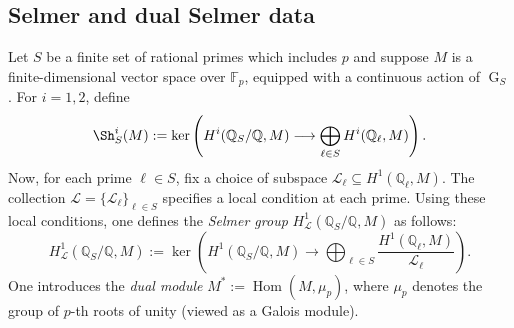 \documentclass[table]{amsart}
\numberwithin{equation}{section}
\begin{document}
\subsection{Selmer and dual Selmer data}
\par Let \( S \) be a finite set of rational primes which includes \( p \) and suppose \( M \) is a finite-dimensional vector space over \( \mathbb{F}_p \), equipped with a continuous action of \( \operatorname{G}_S\). For \( i = 1,2 \), define
\[
\Sh_S^i(M) := \ker\left( H^i(\mathbb{Q}_S/\mathbb{Q}, M) \longrightarrow \bigoplus_{\ell \in S} H^i(\mathbb{Q}_\ell, M) \right).
\]
Now, for each prime \( \ell \in S \), fix a choice of subspace \( \mathcal{L}_\ell \subseteq H^1(\mathbb{Q}_\ell, M) \). The collection \( \mathcal{L} = \{ \mathcal{L}_\ell \}_{\ell \in S} \) specifies a local condition at each prime. Using these local conditions, one defines the \emph{Selmer group} \( H^1_{\mathcal{L}}(\mathbb{Q}_S/\mathbb{Q}, M) \) as follows:
\[
H^1_{\mathcal{L}}(\mathbb{Q}_S/\mathbb{Q}, M) := \ker\left( H^1(\mathbb{Q}_S/\mathbb{Q}, M) \longrightarrow \bigoplus_{\ell \in S} \frac{H^1(\mathbb{Q}_\ell, M)}{\mathcal{L}_\ell} \right).
\]
One introduces the \emph{dual module} \( M^* := \operatorname{Hom}(M, \mu_p) \), where \( \mu_p \) denotes the group of \( p \)-th roots of unity (viewed as a Galois module). %
\end{document}
